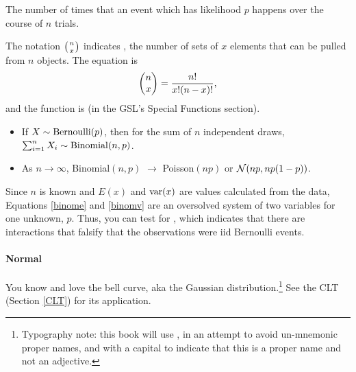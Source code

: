 The number of times that an event which has likelihood $p$ happens over the
course of $n$ trials.

The notation $\left({n\atop x}\right)$ indicates
, the number of sets of $x$ elements that can be
pulled from $n$ objects. The equation is $$\left(\begin{matrix}n\cr x\end{matrix}\right) =
{n!\over x!(n-x)!},$$ and the function is  
(in the GSL's Special Functions section).
 


\begin{itemize}
\item If $X \sim {\rm Bernoulli}(p)$, then for the sum of $n$ independent draws,
$\sum_{i=1}^n X_i \sim {\rm Binomial}(n,p)$.
\item As $n\to\infty$, Binomial$(n,p)$ $\to$ Poisson$(np)$ or ${\cal
N}(np, np(1-p))$.
\end{itemize}

Since $n$ is known and $E(x)$ and $\operatorname{var}(x)$ are values calculated from
the data, Equations \ref{binome} and \ref{binomv} are an oversolved
system of two variables for one unknown, $p$. Thus, you can test for
, which indicates that there are interactions that
falsify that the observations were iid Bernoulli events.

\paragraph{Normal}

You know and love the bell curve, aka the Gaussian
distribution.\footnote{Typography note: this book will use ,
in an attempt to avoid un-mnemonic proper names, and with a capital to indicate
that this is a proper name and not an adjective.} See the CLT (Section
\ref{CLT}) for its application.



